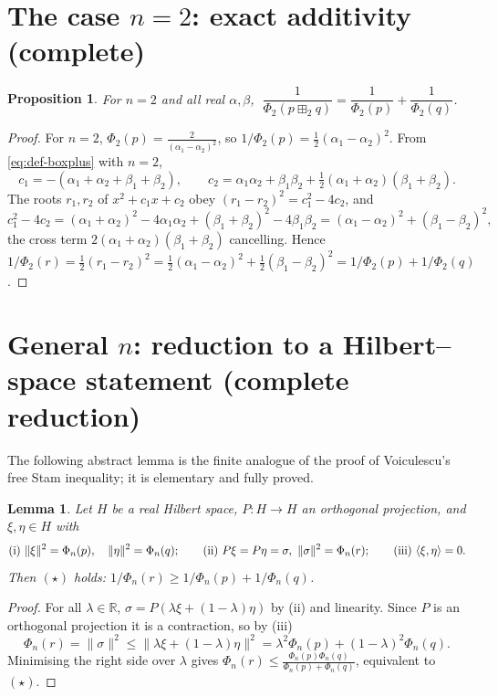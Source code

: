 \documentclass[12pt]{article}
\newtheorem{lemma}{Lemma}
\newtheorem{proposition}{Proposition}
\theoremstyle{definition}
\newcommand{\bR}{\mathbb{R}}
\begin{document}
\section{The case $n=2$: exact additivity (complete)}\label{sec:n2}

\begin{proposition}\label{prop:n2}
For $n=2$ and all real $\alpha,\beta$,
$\;\dfrac1{\Phi_2(p\boxplus_2 q)}=\dfrac1{\Phi_2(p)}+\dfrac1{\Phi_2(q)}$.
\end{proposition}

\begin{proof}
For $n=2$, $\Phi_2(p)=\frac{2}{(\alpha_1-\alpha_2)^2}$, so
$1/\Phi_2(p)=\tfrac12(\alpha_1-\alpha_2)^2$. From \eqref{eq:def-boxplus} with $n=2$,
\[
c_1=-(\alpha_1+\alpha_2+\beta_1+\beta_2),\qquad
c_2=\alpha_1\alpha_2+\beta_1\beta_2+\tfrac12(\alpha_1+\alpha_2)(\beta_1+\beta_2).
\]
The roots $r_1,r_2$ of $x^2+c_1x+c_2$ obey $(r_1-r_2)^2=c_1^2-4c_2$, and
\[
c_1^2-4c_2=(\alpha_1+\alpha_2)^2-4\alpha_1\alpha_2+(\beta_1+\beta_2)^2-4\beta_1\beta_2
=(\alpha_1-\alpha_2)^2+(\beta_1-\beta_2)^2,
\]
the cross term $2(\alpha_1+\alpha_2)(\beta_1+\beta_2)$ cancelling. Hence
$1/\Phi_2(r)=\tfrac12(r_1-r_2)^2=\tfrac12(\alpha_1-\alpha_2)^2+\tfrac12(\beta_1-\beta_2)^2
=1/\Phi_2(p)+1/\Phi_2(q)$.
\end{proof}

\section{General $n$: reduction to a Hilbert--space statement (complete reduction)}
\label{sec:general}

The following abstract lemma is the finite analogue of the proof of Voiculescu's free Stam
inequality; it is elementary and fully proved.

\begin{lemma}\label{lem:reduction}
Let $H$ be a real Hilbert space, $P\colon H\to H$ an orthogonal projection, and
$\xi,\eta\in H$ with
\[
\textup{(i)}\ \|\xi\|^2=\Phi_n(p),\quad \|\eta\|^2=\Phi_n(q);\qquad
\textup{(ii)}\ P\xi=P\eta=\sigma,\ \|\sigma\|^2=\Phi_n(r);\qquad
\textup{(iii)}\ \langle\xi,\eta\rangle=0.
\]
Then $(\star)$ holds: $1/\Phi_n(r)\ge 1/\Phi_n(p)+1/\Phi_n(q)$.
\end{lemma}

\begin{proof}
For all $\lambda\in\bR$, $\sigma=P(\lambda\xi+(1-\lambda)\eta)$ by (ii) and linearity. Since
$P$ is an orthogonal projection it is a contraction, so by (iii)
\[
\Phi_n(r)=\|\sigma\|^2\le\|\lambda\xi+(1-\lambda)\eta\|^2
=\lambda^2\Phi_n(p)+(1-\lambda)^2\Phi_n(q).
\]
Minimising the right side over $\lambda$ gives $\Phi_n(r)\le\frac{\Phi_n(p)\Phi_n(q)}
{\Phi_n(p)+\Phi_n(q)}$, equivalent to $(\star)$.
\end{proof}
\end{document}
